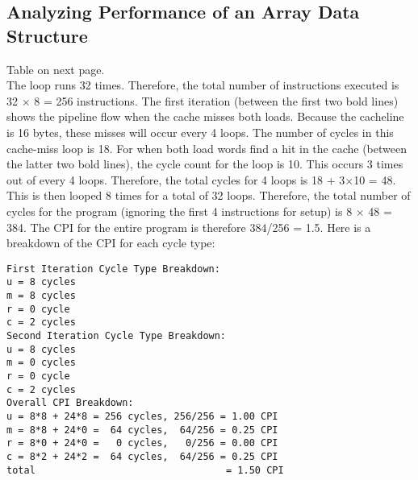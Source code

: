 \documentclass[10pt]{article}
\begin{document}
\subsection{Analyzing Performance of an Array Data Structure}
Table on next page.\\
The loop runs 32 times. Therefore, the total number of instructions executed is 32 $\times$ 8 = 256 instructions. 
The first iteration (between the first two bold lines) shows the pipeline flow when the cache misses both loads. Because the cacheline is 16 bytes, these misses will occur every 4 loops. The number of cycles in this cache-miss loop is 18. For when both load words find a hit in the cache (between the latter two bold lines), the cycle count for the loop is 10. This occurs 3 times out of every 4 loops. Therefore, the total cycles for 4 loops is 18 + 3$\times$10 = 48. This is then looped 8 times for a total of 32 loops. Therefore, the total number of cycles for the program (ignoring the first 4 instructions for setup) is 8 $\times$ 48 = 384. The CPI for the entire program is therefore 384/256 = 1.5.
Here is a breakdown of the CPI for each cycle type:\\
\begin{lstlisting}
First Iteration Cycle Type Breakdown:
u = 8 cycles
m = 8 cycles
r = 0 cycle
c = 2 cycles
Second Iteration Cycle Type Breakdown:
u = 8 cycles
m = 0 cycles
r = 0 cycle
c = 2 cycles
Overall CPI Breakdown:
u = 8*8 + 24*8 = 256 cycles, 256/256 = 1.00 CPI
m = 8*8 + 24*0 =  64 cycles,  64/256 = 0.25 CPI
r = 8*0 + 24*0 =   0 cycles,   0/256 = 0.00 CPI
c = 8*2 + 24*2 =  64 cycles,  64/256 = 0.25 CPI
total                                 = 1.50 CPI
\end{lstlisting}
\end{document}
